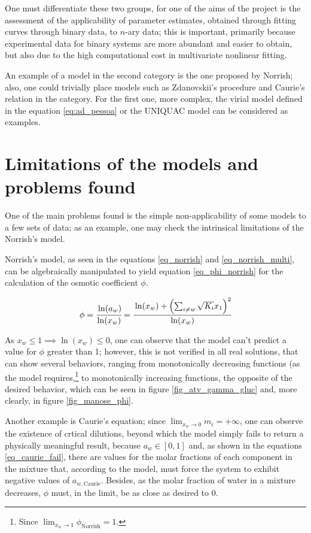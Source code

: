 \documentclass[
	12pt,				%
	openright,
	twoside,
	a4paper,			%
	brazil,			%
	french,				%
	english				%
	]{abntex2}
\begin{document}
One must differentiate these two groups, for one of the aims of the project
is the assessment of the applicability of parameter estimates, obtained through
fitting curves through binary data, to $n$-ary data; this is important, primarily
because experimental data for binary systems are more abundant and easier to
obtain, but also due to the high computational cost in multivariate nonlinear
fitting.

An example of a model in the second category is the one proposed by Norrish; also,
one could trivially place models such as Zdanovskii's procedure and Caurie's
relation in the category. For the first one, more complex, the virial model defined
in the equation \ref{eq:ad_pessoa} or the UNIQUAC model can be considered as
examples.

\section{Limitations of the models and problems found}

One of the main problems found is the simple non-applicability of some models
to a few sets of data; as an example, one may check the intrinsical limitations
of the Norrish's model.

Norrish's model, as seen in the equations \ref{eq_norrish} and
\ref{eq_norrish_multi}, can be algebraically manipulated to yield equation
\ref{eq_phi_norrish} for the calculation of the osmotic coefficient $\phi$.

\begin{equation}
	\label{eq_phi_norrish}
	\phi = \cfrac{\ln(a_w)}{\ln(x_w)} = \cfrac{\ln(x_w) + \left(\sum_{ i\neq w}
	\sqrt{K_i}x_1\right)^2}{\ln(x_w)}
\end{equation}

As $x_w \le 1 \implies \ln(x_w) \le 0$, one can observe that the model can't
predict a value for $\phi$ greater than 1; however, this is not verified
in all real solutions, that can show several behaviors, ranging from
monotonically decreasing functions (as the model requires,\footnote{%
	Since $\lim_{x_w \to 1}\phi_\text{Norrish} = 1$.
} to monotonically increasing functions, the opposite of the desired
behavior, which can be seen in figure \ref{fig_atv_gamma_gluc}
and, more clearly, in figure \ref{fig_manose_phi}.

Another example is Caurie's equation; since $\lim_{x_w \to 0}m_i = +\infty$,
one can observe the existence of crtical dilutions, beyond which the
model simply fails to return a physically meaningful result, because
$a_w \in [0,1]$ and, as shown in the equations \ref{eq_caurie_fail},
there are values for the molar fractions of each component in the mixture
that, according to the model, must force the system to exhibit negative
values of $a_{w,\text{Caurie}}$. Besides, as the molar fraction of water
in a mixture decreases, $\phi$ must, in the limit, be as close as
desired to 0.
\end{document}
